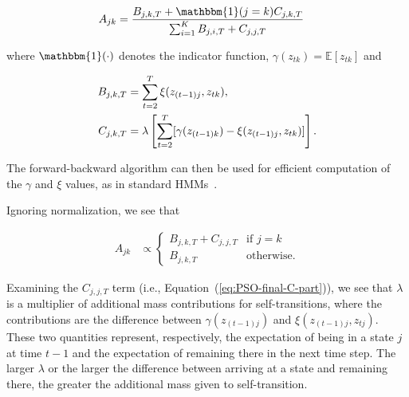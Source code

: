 \documentclass[letterpaper]{article}
\begin{document}
\vspace{-0.5cm}
\begin{align}\label{eq:PSO-final}
    A_{jk} &= \frac{B_{j,k,T} + {\mathbbm{1}(j = k)}C_{j,k,T}} 
                   {\sum_{i=1}^{K} B_{j,i,T} + C_{j,j,T}}
\end{align}
\vspace{-0.1cm}

where $\mathbbm{1}(\cdot)$ denotes the indicator function, $\gamma(z_{tk}) = \mathbb{E}[z_{tk}]$ and

\vspace{-0.5cm}
\begin{align}\label{eq:PSO-final-C-part}
    B_{j,k,T} &= \sum_{t=2}^{T} \xi(z_{(t-1)j}, z_{tk}), \notag\\
    C_{j,k,T} &= \lambda\left[\sum_{t=2}^{T}[\gamma(z_{(t-1)k}) - \xi(z_{(t-1)j}, z_{tk})]\right].
\end{align}
\vspace{-0.1cm}

The forward-backward algorithm can then be used for efficient computation of the $\gamma$ and $\xi$ values, as in standard HMMs~\cite{bishop2007pattern}.

Ignoring normalization, we see that

\vspace{-0.5cm}
\begin{align*}
    A_{jk} &\propto \begin{cases} 
                B_{j,k,T} + C_{j,j,T} & \mbox{if } j=k \\ 
                B_{j,k,T} & \mbox{otherwise.}
              \end{cases}
\end{align*}
\vspace{-0.1cm}

Examining the $C_{j,j,T}$ term (i.e., Equation~(\ref{eq:PSO-final-C-part})), we see that $\lambda$ is a multiplier of
additional mass contributions for self-transitions, where the contributions are
the difference between $\gamma(z_{(t-1)j})$ and $\xi(z_{(t-1)j}, z_{tj})$. These
two quantities represent, respectively, the expectation of being in a state $j$
at time $t-1$ and the expectation of remaining there in the next time step. The
larger $\lambda$ or the larger the difference between arriving at a state and
remaining there, the greater the additional mass given to self-transition.
\vspace{-0.1cm}
\end{document}
